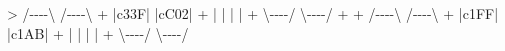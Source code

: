 \documentclass[
]{article}
\newenvironment{Shaded}{\begin{snugshade}}{\end{snugshade}}
\newcommand{\NormalTok}[1]{#1}
\begin{document}
\begin{Shaded}
\begin{Highlighting}[]
\NormalTok{\textgreater{} /{-}{-}{-}{-}\textbackslash{} /{-}{-}{-}{-}\textbackslash{}}
\NormalTok{+ |c33F| |cC02|}
\NormalTok{+ |    | |    |}
\NormalTok{+ \textbackslash{}{-}{-}{-}{-}/ \textbackslash{}{-}{-}{-}{-}/}
\NormalTok{+ }
\NormalTok{+ /{-}{-}{-}{-}\textbackslash{} /{-}{-}{-}{-}\textbackslash{}}
\NormalTok{+ |c1FF| |c1AB|}
\NormalTok{+ |    | |    |}
\NormalTok{+ \textbackslash{}{-}{-}{-}{-}/ \textbackslash{}{-}{-}{-}{-}/}
\end{Highlighting}
\end{Shaded}
\end{document}
